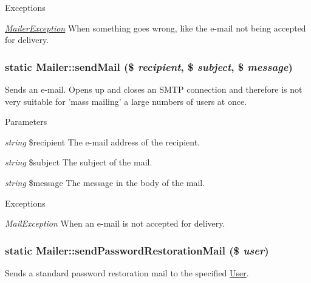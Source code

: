 \begin{DoxyExceptions}{Exceptions}
\item[{\em \hyperlink{classMailerException}{MailerException}}]When something goes wrong, like the e-\/mail not being accepted for delivery. \end{DoxyExceptions}
\hypertarget{classMailer_a5eca35182ea74f3233ad375a07716639}{
\subsubsection[{sendMail}]{\setlength{\rightskip}{0pt plus 5cm}static Mailer::sendMail (\$ {\em recipient}, \/  \$ {\em subject}, \/  \$ {\em message})}}
\label{classMailer_a5eca35182ea74f3233ad375a07716639}
Sends an e-\/mail. Opens up and closes an SMTP connection and therefore is not very suitable for 'mass mailing' a large numbers of users at once.


\begin{DoxyParams}{Parameters}
\item[{\em string}]\$recipient The e-\/mail address of the recipient. \item[{\em string}]\$subject The subject of the mail. \item[{\em string}]\$message The message in the body of the mail.\end{DoxyParams}

\begin{DoxyExceptions}{Exceptions}
\item[{\em MailException}]When an e-\/mail is not accepted for delivery. \end{DoxyExceptions}
\hypertarget{classMailer_ae8402e99832c34bbe8b49fdb9b2f5cc8}{
\subsubsection[{sendPasswordRestorationMail}]{\setlength{\rightskip}{0pt plus 5cm}static Mailer::sendPasswordRestorationMail (\$ {\em user})}}
\label{classMailer_ae8402e99832c34bbe8b49fdb9b2f5cc8}
Sends a standard password restoration mail to the specified \hyperlink{classUser}{User}.


